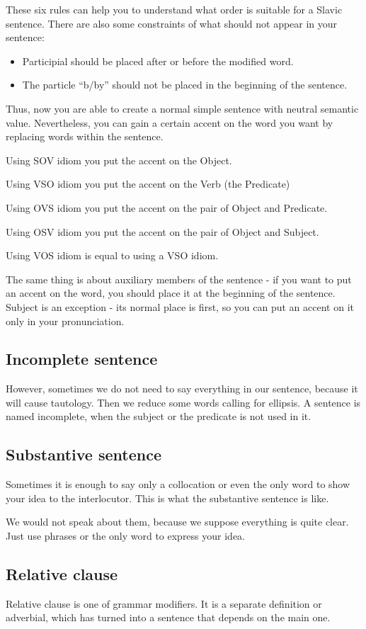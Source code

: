 These six rules can help you to understand what order is suitable for a Slavic sentence. There are also some constraints of what should not appear in your sentence:

\begin{itemize}
	\item Participial should be placed after or before the modified word.
	\item The particle “b/by” should not be placed in the beginning of the sentence.
\end{itemize}

Thus, now you are able to create a normal simple sentence with neutral semantic value. Nevertheless, you can gain a certain accent on the word you want by replacing words within the sentence.

Using SOV idiom you put the accent on the Object. 

Using VSO idiom you put the accent on the Verb (the Predicate)

Using OVS idiom you put the accent on the pair of Object and Predicate.

Using OSV idiom you put the accent on the pair of Object and Subject.

Using VOS idiom is equal to using a VSO idiom.

The same thing is about auxiliary members of the sentence - if you want to put an accent on the word, you should place it at the beginning of the sentence. Subject is an exception - its normal place is first, so you can put an accent on it only in your pronunciation.

\subsection{Incomplete sentence}
However, sometimes we do not need to say everything in our sentence, because it will cause tautology. Then we reduce some words calling for ellipsis. A sentence is named incomplete, when the subject or the predicate is not used in it.

\subsection{Substantive sentence}
Sometimes it is enough to say only a collocation or even the only word to show your idea to the interlocutor. This is what the substantive sentence is like.

We would not speak about them, because we suppose everything is quite clear. Just use phrases or the only word to express your idea.

\subsection{Relative clause}
Relative clause is one of grammar modifiers. It is a separate definition or adverbial, which has turned into a sentence that depends on the main one.
